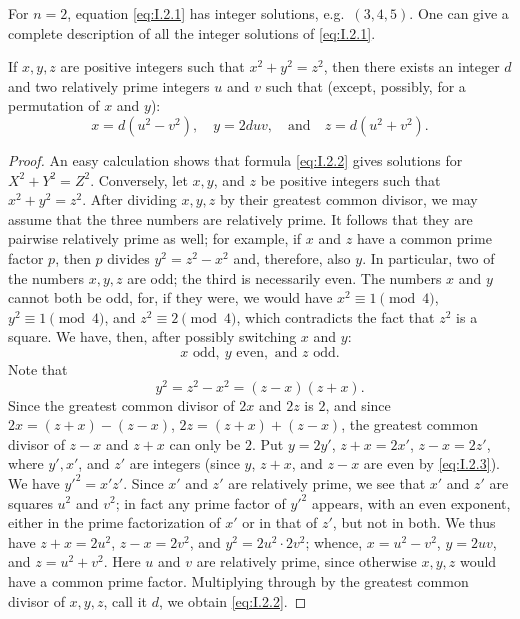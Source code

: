 For $n=2$, equation \eqref{eq:I.2.1} has integer solutions, e.g.\
$(3,4,5)$. One can give a complete description of all the integer solutions
of \eqref{eq:I.2.1}.

\begin{theorem}
\label{thm:I.2.1}
If $x,y,z$ are positive integers such that $x^{2}+y^{2}=z^{2}$, then there
exists an integer $d$ and two relatively prime integers $u$ and $v$ such
that (except, possibly, for a permutation of $x$ and $y$):
\begin{equation}
x=d(u^{2}-v^{2}),\quad y=2duv,\quad\text{and}\quad z=d(u^{2}+v^{2}).
\label{eq:I.2.2}
\end{equation}
\end{theorem}

\begin{proof}
An easy calculation shows that formula \eqref{eq:I.2.2} gives solutions for
$X^{2}+Y^{2}=Z^{2}$. Conversely, let $x,y$, and $z$ be positive integers
such that $x^{2}+y^{2}=z^{2}$. After dividing $x,y,z$ by their greatest
common divisor, we may assume that the three numbers are relatively prime.
It follows that they are pairwise relatively prime as well; for example, if
$x$ and $z$ have a common prime factor $p$, then $p$ divides
$y^{2}=z^{2}-x^{2}$ and, therefore, also $y$. In particular, two of the
numbers $x,y,z$ are odd; the third is necessarily even. The numbers $x$ and
$y$ cannot both be odd, for, if they were, we would have
$x^{2}\equiv1\pmod{4}$, $y^{2}\equiv1\pmod{4}$, and
$z^{2}\equiv2\pmod{4}$, which contradicts the fact that $z^{2}$ is a square.
We have, then, after possibly switching $x$ and $y$:
\begin{equation}
x\text{ odd},\ y\text{ even},\text{ and }z\text{ odd}.
\label{eq:I.2.3}
\end{equation}
Note that
\begin{equation}
y^{2}=z^{2}-x^{2}=(z-x)(z+x).
\label{eq:I.2.4}
\end{equation}
Since the greatest common divisor of $2x$ and $2z$ is $2$, and since
$2x=(z+x)-(z-x)$, $2z=(z+x)+(z-x)$, the greatest common divisor of $z-x$
and $z+x$ can only be $2$. Put $y=2y'$, $z+x=2x'$, $z-x=2z'$, where
$y',x'$, and $z'$ are integers (since $y$, $z+x$, and $z-x$ are even by
\eqref{eq:I.2.3}). We have $y'^{2}=x'z'$. Since $x'$ and $z'$ are relatively
prime, we see that $x'$ and $z'$ are squares $u^{2}$ and $v^{2}$; in fact
any prime factor of $y'^{2}$ appears, with an even exponent, either in the
prime factorization of $x'$ or in that of $z'$, but not in both. We thus
have $z+x=2u^{2}$, $z-x=2v^{2}$, and $y^{2}=2u^{2}\cdot2v^{2}$; whence,
$x=u^{2}-v^{2}$, $y=2uv$, and $z=u^{2}+v^{2}$. Here $u$ and $v$ are
relatively prime, since otherwise $x,y,z$ would have a common prime factor.
Multiplying through by the greatest common divisor of $x,y,z$, call it $d$,
we obtain \eqref{eq:I.2.2}.
\end{proof}

